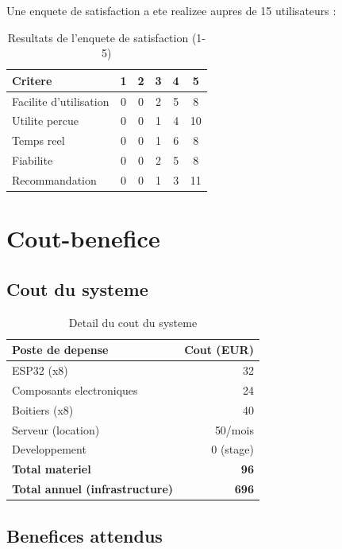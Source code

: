 Une enquete de satisfaction a ete realizee aupres de 15 utilisateurs :

\begin{table}[htbp]
\centering
\renewcommand{\arraystretch}{1.3}
\begin{tabular}{l c c c c c}
\toprule
\textbf{Critere} & \textbf{1} & \textbf{2} & \textbf{3} & \textbf{4} & \textbf{5} \\
\midrule
Facilite d'utilisation & 0 & 0 & 2 & 5 & 8 \\
Utilite percue & 0 & 0 & 1 & 4 & 10 \\
Temps reel & 0 & 0 & 1 & 6 & 8 \\
Fiabilite & 0 & 0 & 2 & 5 & 8 \\
Recommandation & 0 & 0 & 1 & 3 & 11 \\
\bottomrule
\end{tabular}
\caption{Resultats de l'enquete de satisfaction (1-5)}
\label{tab:satisfaction}
\end{table}

\section{Cout-benefice}

\subsection{Cout du systeme}

\begin{table}[htbp]
\centering
\renewcommand{\arraystretch}{1.3}
\begin{tabular}{l r}
\toprule
\textbf{Poste de depense} & \textbf{Cout (EUR)} \\
\midrule
ESP32 (x8) & 32 \\
Composants electroniques & 24 \\
Boitiers (x8) & 40 \\
Serveur (location) & 50/mois \\
Developpement & 0 (stage) \\
\midrule
\textbf{Total materiel} & \textbf{96} \\
\textbf{Total annuel (infrastructure)} & \textbf{696} \\
\bottomrule
\end{tabular}
\caption{Detail du cout du systeme}
\label{tab:cout}
\end{table}

\subsection{Benefices attendus}

